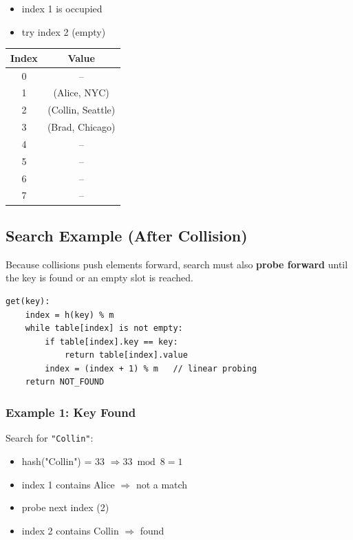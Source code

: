 \documentclass{article}
\begin{document}
\begin{itemize}
  \item index 1 is occupied
  \item try index 2 (empty)
\end{itemize}

\begin{center}
\begin{tabular}{c c}
\toprule
Index & Value \\
\midrule
0 & -- \\
1 & (Alice, NYC) \\
2 & (Collin, Seattle) \\
3 & (Brad, Chicago) \\
4 & -- \\
5 & -- \\
6 & -- \\
7 & -- \\
\bottomrule
\end{tabular}
\end{center}

\subsection{Search Example (After Collision)}

Because collisions push elements forward, search must also \textbf{probe forward} until the key is found or an empty slot is reached.

\begin{verbatim}
get(key):
    index = h(key) % m
    while table[index] is not empty:
        if table[index].key == key:
            return table[index].value
        index = (index + 1) % m   // linear probing
    return NOT_FOUND
\end{verbatim}

\subsubsection*{Example 1: Key Found}
Search for \texttt{"Collin"}:

\begin{itemize}
  \item hash("Collin") = 33 $\Rightarrow 33 \bmod 8 = 1$
  \item index 1 contains Alice $\Rightarrow$ not a match
  \item probe next index (2)
  \item index 2 contains Collin $\Rightarrow$ found
\end{itemize}
\end{document}
